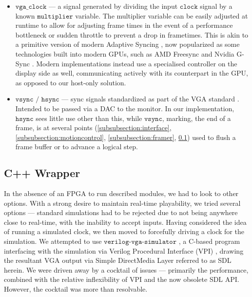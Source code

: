 \begin{itemize}
    \item \(\texttt{vga\_clock}\) --- a signal generated by dividing the 
            input \(\texttt{clock}\) signal by a known \(\texttt{multiplier}\)
            variable. The multiplier variable can be easily adjusted at runtime
            to allow for adjusting frame times in the event of a performance
            bottleneck or sudden throttle to prevent a drop in frametimes. This
            is akin to a primitive version of modern Adaptive Syncing \cite{varrefresh},
            now popularized as some technologies built into modern GPUs,
            such as AMD Freesync \cite{freesync} and Nvidia G-Sync \cite{gsync}. 
            Modern implementations instead use a specialised controller on the display
            side as well, communicating actively with its counterpart in the GPU,
            as opposed to our host-only solution.
    \item \(\texttt{vsync / hsync}\) --- sync signals standardized as part of the VGA
            standard \cite{vgastandard}. Intended to be passed via a DAC to the monitor.
            In our implementation, \(\texttt{hsync}\) sees little use other than this,
            while \(\texttt{vsync}\), marking, the end of a frame, is at several points 
            (\ref{subsubsection:interface}, \ref{subsubsection:motioncontrol}, \ref{subsubsection:framer}, 
            \ref{subsection:cppwrap}) used to flush a frame buffer or to advance a logical step.
\end{itemize}


\subsection{C++ Wrapper}
\label{subsection:cppwrap}

In the absence of an FPGA to run described modules, 
we had to look to other options. With a strong desire to 
maintain real-time playability, we tried several options ---
standard simulations had to be rejected due to not being 
anywhere close to real-time, with the inability to accept inputs.
Having considered the idea of running a simulated clock, we then
moved to forcefully driving a clock for the simulation. We attempted
to use \(\texttt{verilog-vga-simulator}\) \cite{vga-simulator},
a C-based program interfacing with the simulation via 
Verilog Procedural Interface (VPI) \cite{vpi}, drawing the resultant
VGA output via Simple DirectMedia Layer \cite{sdl} referred to as 
SDL herein. We were driven away by a cocktail of issues --- primarily
the performance, combined with the relative inflexibility of VPI 
and the now obsolete \cite{sdl_obsolete} SDL API. However, the cocktail
was more than resolvable.

